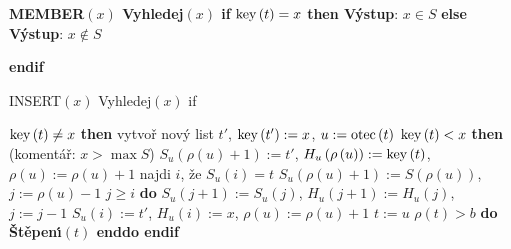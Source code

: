 {\bf MEMBER$\left(x\right)$\newline 
Vyhledej$\left(x\right)$\newline 
if} $\operatorname{key}\left(t\right)=x$ {\bf then V\'ystup}: $x\in S$ {\bf else V\'ystup}: $x\notin S$ {\bf endif
\medskip

INSERT$\left(x\right)$\newline
Vyhledej$\left(x\right)$\newline 
if} $\operatorname{key}\left(t\right)\ne x$ {\bf then}\newline 
\phantom{---}vytvo\v r nov\'y list $t'$, $\operatorname{key}\left(t'\right):=x$, $u:=\operatorname{otec}\left(t\right)$\newline 
\phantom{---}{\bf if} $\operatorname{key}\left(t\right)<x$ {\bf then}\newline 
(koment\'a\v r: $x>\max S$)\newline 
\phantom{------}$S_u\left(\rho \left(u\right)+1\right):=t'$, $H_u\left(\rho \left(u\right)\right):=\operatorname{key}\left(t\right)$, $\rho \left(u\right):=\rho 
\left(u\right)+1$\newline 
\phantom{---}{\bf else}\newline 
\phantom{------}najdi $i$, \v ze $S_u\left(i\right)=t$\newline 
\phantom{------}$S_u\left(\rho \left(u\right)+1\right):=S\left(\rho \left(u\right)\right)$, $j:=\rho \left(u\right)-1$\newline 
\phantom{------}{\bf while} $j\ge i$ {\bf do}\newline 
\phantom{---------}$S_u\left(j+1\right):=S_u\left(j\right)$, $H_u\left(j+1\right):=H_u\left(j\right)$, $j:=j-1$\newline 
\phantom{------}{\bf enddo}\newline 
\phantom{------}$S_u\left(i\right):=t'$, $H_u\left(i\right):=x$, $\rho \left(u\right):=\rho \left(u\right)+1$\newline 
\phantom{---}{\bf endif}\newline 
\phantom{---}$t:=u$\newline 
\phantom{---}{\bf while} $\rho \left(t\right)>b$ {\bf do \v St\v epen\'\i$\left(t\right)$ enddo\newline 
endif}
\medskip

